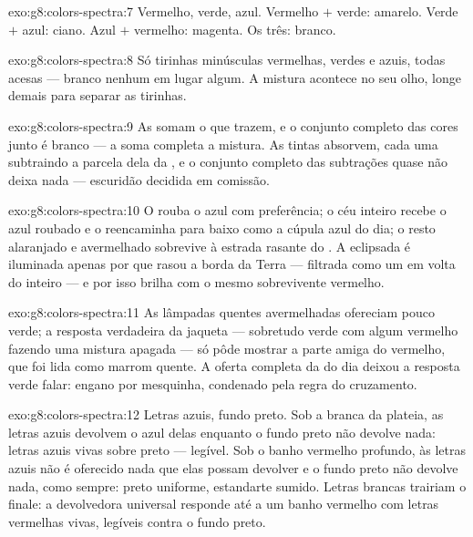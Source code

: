 \begin{solution}{exo:g8:colors-spectra:7}
Vermelho, verde, azul. Vermelho $+$ verde: amarelo. Verde $+$ azul:
ciano. Azul $+$ vermelho: magenta. Os três: branco.
\end{solution}

\begin{solution}{exo:g8:colors-spectra:8}
Só tirinhas minúsculas vermelhas, verdes e azuis, todas acesas ---
branco nenhum em lugar algum. A mistura acontece no seu olho, longe
demais para separar as tirinhas.
\end{solution}

\begin{solution}{exo:g8:colors-spectra:9}
As  somam o que trazem, e o conjunto completo das cores junto é
branco --- a soma completa a mistura. As tintas absorvem, cada uma
subtraindo a parcela dela da , e o conjunto completo das subtrações
quase não deixa nada --- escuridão decidida em comissão.
\end{solution}

\begin{solution}{exo:g8:colors-spectra:10}
O  rouba o azul com preferência; o céu inteiro recebe o azul
roubado e o reencaminha para baixo como a cúpula azul do dia; o resto
alaranjado e avermelhado sobrevive à estrada rasante do . A
 eclipsada é iluminada apenas por  que rasou a borda da Terra
--- filtrada como um  em volta do  inteiro --- e por
isso brilha com o mesmo sobrevivente vermelho.
\end{solution}

\begin{solution}{exo:g8:colors-spectra:11}
As lâmpadas quentes avermelhadas ofereciam pouco verde; a resposta
verdadeira da jaqueta --- sobretudo verde com algum vermelho fazendo
uma mistura apagada --- só pôde mostrar a parte amiga do vermelho, que
foi lida como marrom quente. A oferta completa da  do dia deixou a
resposta verde falar: engano por  mesquinha, condenado pela regra
do cruzamento.
\end{solution}

\begin{solution}{exo:g8:colors-spectra:12}
Letras azuis, fundo preto. Sob a  branca da plateia, as letras
azuis devolvem o azul delas enquanto o fundo preto não devolve nada:
letras azuis vivas sobre preto --- legível. Sob o banho vermelho
profundo, às letras azuis não é oferecido nada que elas possam
devolver e o fundo preto não devolve nada, como sempre: preto
uniforme, estandarte sumido. Letras brancas trairiam o finale: a
devolvedora universal responde até a um banho vermelho com letras
vermelhas vivas, legíveis contra o fundo preto.
\end{solution}

